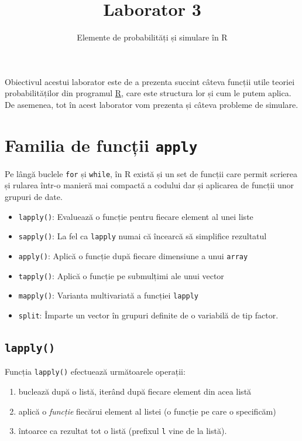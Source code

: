 \documentclass[]{article}
\title{Laborator 3}
\subtitle{Elemente de probabilități și simulare în R}
\author{}
\date{}
\providecommand{\tightlist}{%
  \setlength{\itemsep}{0pt}\setlength{\parskip}{0pt}}
\begin{document}
\maketitle

\thispagestyle{fancy}

Obiectivul acestui laborator este de a prezenta succint câteva funcții
utile teoriei probabilităților din programul
\href{https://cran.r-project.org/}{R}, care este structura lor și cum le
putem aplica. De asemenea, tot în acest laborator vom prezenta și câteva
probleme de simulare.

\section{\texorpdfstring{Familia de funcții
\texttt{apply}}{Familia de funcții apply}}\label{familia-de-functii-apply}

Pe lângă buclele \texttt{for} și \texttt{while}, în R există și un set
de funcții care permit scrierea și rularea într-o manieră mai compactă a
codului dar și aplicarea de funcții unor grupuri de date.

\begin{itemize}
\item
  \texttt{lapply()}: Evaluează o funcție pentru fiecare element al unei
  liste
\item
  \texttt{sapply()}: La fel ca \texttt{lapply} numai că încearcă să
  simplifice rezultatul
\item
  \texttt{apply()}: Aplică o funcție după fiecare dimensiune a unui
  \texttt{array}
\item
  \texttt{tapply()}: Aplică o funcție pe submulțimi ale unui vector
\item
  \texttt{mapply()}: Varianta multivariată a funcției \texttt{lapply}
\item
  \texttt{split}: Împarte un vector în grupuri definite de o variabilă
  de tip factor.
\end{itemize}

\subsection{\texorpdfstring{\texttt{lapply()}}{lapply()}}\label{lapply}

Funcția \texttt{lapply()} efectuează următoarele operații:

\begin{enumerate}
\def\labelenumi{\arabic{enumi}.}
\tightlist
\item
  buclează după o listă, iterând după fiecare element din acea listă
\item
  aplică o \emph{funcție} fiecărui element al listei (o funcție pe care
  o specificăm)
\item
  întoarce ca rezultat tot o listă (prefixul \texttt{l} vine de la
  listă).
\end{enumerate}
\end{document}
